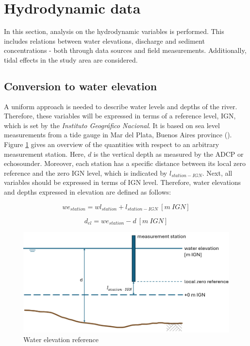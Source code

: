 \section{Hydrodynamic data}
\label{sec:Hydrodynamic data}
In this section, analysis on the hydrodynamic variables is performed. This includes relations between water elevations, discharge and sediment concentrations - both through data sources and field measurements. Additionally, tidal effects in the study area are considered. 

\subsection{Conversion to water elevation}
A uniform approach is needed to describe water levels and depths of the river. Therefore, these variables will be expressed in terms of a reference level, IGN, which is set by the \textit{Instituto Geográfico Nacional}. It is based on sea level measurements from a tide gauge in Mar del Plata, Buenos Aires province (\cite{ReferenciaVerticalInstituto}). Figure \ref{fig:waterelevationreference} gives an overview of the quantities with respect to an arbitrary measurement station. Here, $d$ is the vertical depth as measured by the ADCP or echosounder. Moreover, each station has a specific distance between its local zero reference and the zero IGN level, which is indicated by $l_{station-IGN}$. Next, all variables should be expressed in terms of IGN level. Therefore, water elevations and depths expressed in elevation are defined as follows:

\begin{equation}
    we_{station} = wl_{station} + l_{station-IGN} ~[m~IGN]
\end{equation}

\begin{equation}
    d_{el} = we_{station}-d ~[m~IGN]
\end{equation}


\begin{figure}[H]
    \centering
    \includegraphics[width=0.75\linewidth]{figures/ch5/waterelevations.png}
    \caption{Water elevation reference}
    \label{fig:waterelevationreference}
\end{figure}

